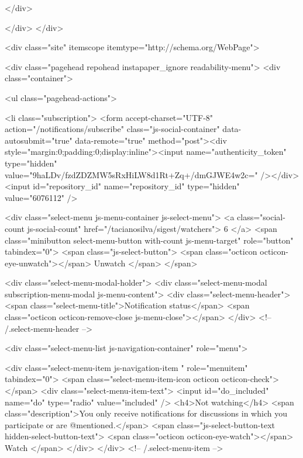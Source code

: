 </div>


    
  </div>
</div>

      

      




          <div class="site" itemscope itemtype="http://schema.org/WebPage">
    
    <div class="pagehead repohead instapaper_ignore readability-menu">
      <div class="container">
        

<ul class="pagehead-actions">

    <li class="subscription">
      <form accept-charset="UTF-8" action="/notifications/subscribe" class="js-social-container" data-autosubmit="true" data-remote="true" method="post"><div style="margin:0;padding:0;display:inline"><input name="authenticity_token" type="hidden" value="9haLDv/fzdZDZMW5sRxHiLW8d1Rt+Zq+/dmGJWE4w2c=" /></div>  <input id="repository_id" name="repository_id" type="hidden" value="6076112" />

    <div class="select-menu js-menu-container js-select-menu">
      <a class="social-count js-social-count" href="/tacianosilva/sigest/watchers">
        6
      </a>
      <span class="minibutton select-menu-button with-count js-menu-target" role="button" tabindex="0">
        <span class="js-select-button">
          <span class="octicon octicon-eye-unwatch"></span>
          Unwatch
        </span>
      </span>

      <div class="select-menu-modal-holder">
        <div class="select-menu-modal subscription-menu-modal js-menu-content">
          <div class="select-menu-header">
            <span class="select-menu-title">Notification status</span>
            <span class="octicon octicon-remove-close js-menu-close"></span>
          </div> <!-- /.select-menu-header -->

          <div class="select-menu-list js-navigation-container" role="menu">

            <div class="select-menu-item js-navigation-item " role="menuitem" tabindex="0">
              <span class="select-menu-item-icon octicon octicon-check"></span>
              <div class="select-menu-item-text">
                <input id="do_included" name="do" type="radio" value="included" />
                <h4>Not watching</h4>
                <span class="description">You only receive notifications for discussions in which you participate or are @mentioned.</span>
                <span class="js-select-button-text hidden-select-button-text">
                  <span class="octicon octicon-eye-watch"></span>
                  Watch
                </span>
              </div>
            </div> <!-- /.select-menu-item -->

